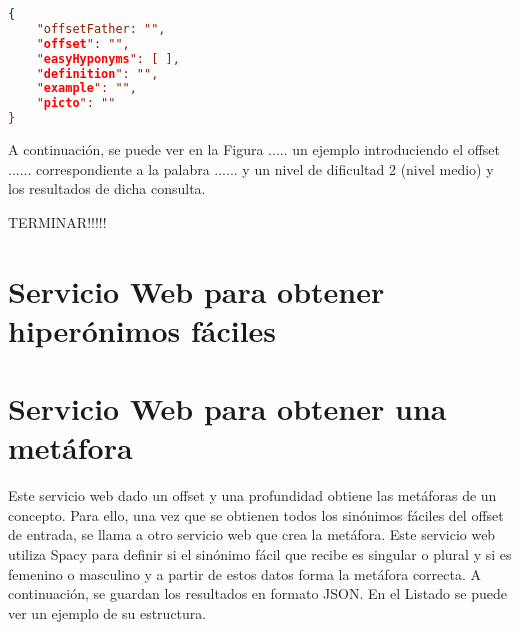 \begin{lstlisting}[language=json, caption= Estructura JSON para hipónimos fáciles, label={lst:JSONhiponimofacil}, frame=single]
{ 
	"offsetFather: "",
	"offset": "", 
	"easyHyponyms": [ ], 
	"definition": "", 
	"example": "", 
	"picto": ""
}
\end{lstlisting}


A continuación, se puede ver en la Figura ..... un ejemplo introduciendo el offset ...... correspondiente a la palabra ......  y un nivel de dificultad 2 (nivel medio) y los resultados de dicha consulta.


TERMINAR!!!!!
\section{Servicio Web  para obtener hiperónimos fáciles}

\section{Servicio Web  para obtener una metáfora}
Este servicio web dado un offset y una profundidad obtiene las metáforas de un concepto.
Para ello, una vez que se obtienen todos los sinónimos fáciles del offset de entrada, se llama a otro servicio web que crea la metáfora. Este servicio web utiliza Spacy para definir si el sinónimo fácil que recibe es singular o plural y si es femenino o masculino y a partir de estos datos forma la metáfora correcta.
A continuación, se guardan los resultados en formato JSON. En el Listado   se puede ver un ejemplo de su estructura.





